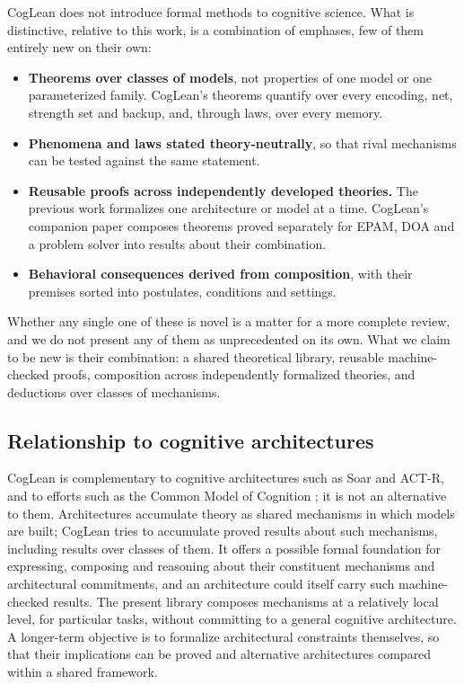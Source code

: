 \documentclass[11pt]{article}
\begin{document}
CogLean does not introduce formal methods to cognitive science. What is distinctive, relative to this work, is a combination of emphases, few of them entirely new on their own:
\begin{itemize}
  \item \textbf{Theorems over classes of models}, not properties of one model or one parameterized family. CogLean's theorems quantify over every encoding, net, strength set and backup, and, through laws, over every memory.
  \item \textbf{Phenomena and laws stated theory-neutrally}, so that rival mechanisms can be tested against the same statement.
  \item \textbf{Reusable proofs across independently developed theories.} The previous work formalizes one architecture or model at a time. CogLean's companion paper composes theorems proved separately for EPAM, DOA and a problem solver into results about their combination.
  \item \textbf{Behavioral consequences derived from composition}, with their premises sorted into postulates, conditions and settings.
\end{itemize}
Whether any single one of these is novel is a matter for a more complete review, and we do not present any of them as unprecedented on its own. What we claim to be new is their combination: a shared theoretical library, reusable machine-checked proofs, composition across independently formalized theories, and deductions over classes of mechanisms.

\subsection{Relationship to cognitive architectures}

CogLean is complementary to cognitive architectures such as Soar and ACT-R, and to efforts such as the Common Model of Cognition \citep{laird2017}; it is not an alternative to them. Architectures accumulate theory as shared mechanisms in which models are built; CogLean tries to accumulate proved results about such mechanisms, including results over classes of them. It offers a possible formal foundation for expressing, composing and reasoning about their constituent mechanisms and architectural commitments, and an architecture could itself carry such machine-checked results. The present library composes mechanisms at a relatively local level, for particular tasks, without committing to a general cognitive architecture. A longer-term objective is to formalize architectural constraints themselves, so that their implications can be proved and alternative architectures compared within a shared framework.
\end{document}
